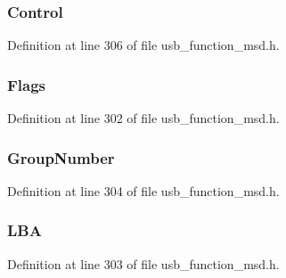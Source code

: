 \subsubsection[{Control}]{ Control}\label{struct_read_write_c_b_a5dc24656c27deb12af74c98930f0bfc5}


Definition at line 306 of file usb\+\_\+function\+\_\+msd.\+h.

\hypertarget{struct_read_write_c_b_a0e44f5f85bf9696d6acd4d0bfb3ec2b3}{}
\subsubsection[{Flags}]{ Flags}\label{struct_read_write_c_b_a0e44f5f85bf9696d6acd4d0bfb3ec2b3}


Definition at line 302 of file usb\+\_\+function\+\_\+msd.\+h.

\hypertarget{struct_read_write_c_b_a6016c3942d93a2a734fa1fa61f69747b}{}
\subsubsection[{Group\+Number}]{ Group\+Number}\label{struct_read_write_c_b_a6016c3942d93a2a734fa1fa61f69747b}


Definition at line 304 of file usb\+\_\+function\+\_\+msd.\+h.

\hypertarget{struct_read_write_c_b_a6999b5425894f3b14fe9b2bbd8bb794b}{}
\subsubsection[{L\+B\+A}]{ L\+B\+A}\label{struct_read_write_c_b_a6999b5425894f3b14fe9b2bbd8bb794b}


Definition at line 303 of file usb\+\_\+function\+\_\+msd.\+h.

\hypertarget{struct_read_write_c_b_a3ac7536b907732d60214ae553910eed9}{}

